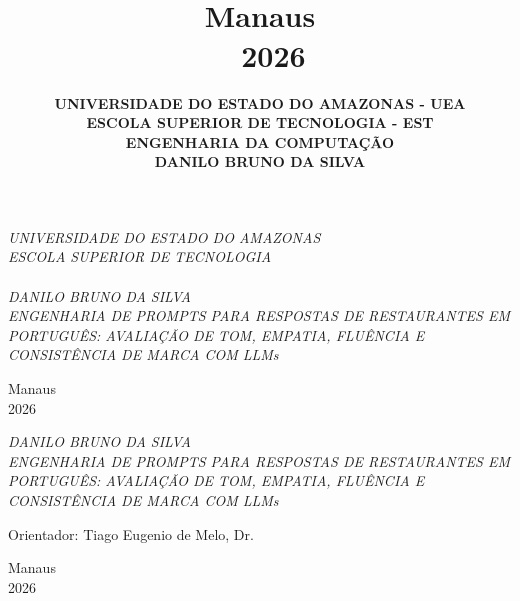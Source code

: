 \documentclass[12pt, a4paper]{article}
\author{ \bf UNIVERSIDADE DO ESTADO DO AMAZONAS - UEA \\[14pt] \small ESCOLA SUPERIOR DE TECNOLOGIA - EST \\[14pt] ENGENHARIA DA COMPUTAÇÃO \\[96pt] DANILO BRUNO DA SILVA\\[96pt]}
\title{ \rm \bf \Large \\[123pt] \rm \small Manaus \\  2026}
\numberwithin{equation}{section}
\newcommand{\bigsize}{\fontsize{12pt}{20pt}\selectfont}
\begin{document}

\thispagestyle{empty}
\begin{center}
\textit{ UNIVERSIDADE DO ESTADO DO AMAZONAS \\
ESCOLA SUPERIOR DE TECNOLOGIA \\[50pt] }
\textit{ \\[70pt] {\bigsize DANILO BRUNO DA SILVA} \\[120pt] }
\textit{ {\bigsize ENGENHARIA DE PROMPTS PARA RESPOSTAS DE RESTAURANTES EM PORTUGUÊS: AVALIAÇÃO DE TOM, EMPATIA, FLUÊNCIA E CONSISTÊNCIA DE MARCA COM LLMs}  \\[104pt] }
\end{center}
\hspace*{8cm}
\vspace*{\fill}
\begin{center}
Manaus \\ 2026
\end{center}

\newpage
\thispagestyle{empty}
\begin{center}
\textit{ {\bigsize DANILO BRUNO DA SILVA} \\[120pt] }
\textit{ {\bigsize \bigsize ENGENHARIA DE PROMPTS PARA RESPOSTAS DE RESTAURANTES EM PORTUGUÊS: AVALIAÇÃO DE TOM, EMPATIA, FLUÊNCIA E CONSISTÊNCIA DE MARCA COM LLMs}  
\\[50pt] }
\end{center}
\hspace*{8cm}
\begin{flushright}
\begin{minipage}{8cm}
\begin{singlespace}

\end{singlespace}
\end{minipage}
\end{flushright}
\begin{center}
Orientador: Tiago Eugenio de Melo, Dr.
\end{center}
\vspace*{\fill}
\begin{center}
Manaus \\ 2026
\end{center}
\end{document}
